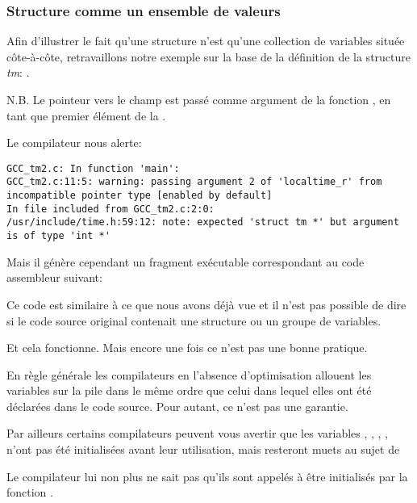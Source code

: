 \subsubsection{Structure comme un ensemble de valeurs}

Afin d'illustrer le fait qu'une structure n'est qu'une collection de variables située côte-à-côte, 
retravaillons notre exemple sur la base de la définition de la structure \emph{tm}: .



N.B. Le pointeur vers le champ  est passé comme argument de la fonction 
, en tant que premier élément de la .

Le compilateur nous alerte:

\begin{lstlisting}[caption=GCC 4.7.3]
GCC_tm2.c: In function 'main':
GCC_tm2.c:11:5: warning: passing argument 2 of 'localtime_r' from incompatible pointer type [enabled by default]
In file included from GCC_tm2.c:2:0:
/usr/include/time.h:59:12: note: expected 'struct tm *' but argument is of type 'int *'
\end{lstlisting}

Mais il génère cependant un fragment exécutable correspondant au code assembleur suivant:



Ce code est similaire à ce que nous avons déjà vue et il n'est pas possible de dire si le code 
source original contenait une structure ou un groupe de variables.

Et cela fonctionne. Mais encore une fois ce n'est pas une bonne pratique. 

En règle générale les compilateurs en l'absence d'optimisation allouent les variables sur la pile 
dans le même ordre que celui dans lequel elles ont été déclarées dans le code source. Pour autant, 
ce n'est pas une garantie.

Par ailleurs certains compilateurs peuvent vous avertir que les variables , 
, , ,  n'ont pas été initialisées avant leur 
utilisation, mais resteront muets au sujet de 

Le compilateur lui non plus ne sait pas qu'ils sont appelés à être initialisés par la fonction 
.

